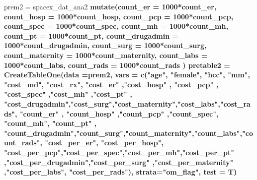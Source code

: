 \documentclass[]{article}
\newenvironment{Shaded}{\begin{snugshade}}{\end{snugshade}}
\newcommand{\KeywordTok}[1]{\textcolor[rgb]{0.13,0.29,0.53}{\textbf{#1}}}
\newcommand{\DataTypeTok}[1]{\textcolor[rgb]{0.13,0.29,0.53}{#1}}
\newcommand{\DecValTok}[1]{\textcolor[rgb]{0.00,0.00,0.81}{#1}}
\newcommand{\StringTok}[1]{\textcolor[rgb]{0.31,0.60,0.02}{#1}}
\newcommand{\OperatorTok}[1]{\textcolor[rgb]{0.81,0.36,0.00}{\textbf{#1}}}
\newcommand{\NormalTok}[1]{#1}
\begin{document}
\begin{Shaded}
\begin{Highlighting}[]
\NormalTok{prem2 =}\StringTok{ }\NormalTok{spacex_dat_ana2 }\OperatorTok{%>%}
\StringTok{  }\KeywordTok{mutate}\NormalTok{(}\DataTypeTok{count_er =} \DecValTok{1000}\OperatorTok{*}\NormalTok{count_er,}
         \DataTypeTok{count_hosp =} \DecValTok{1000}\OperatorTok{*}\NormalTok{count_hosp,}
         \DataTypeTok{count_pcp =} \DecValTok{1000}\OperatorTok{*}\NormalTok{count_pcp,}
         \DataTypeTok{count_spec =} \DecValTok{1000}\OperatorTok{*}\NormalTok{count_spec,}
         \DataTypeTok{count_mh =} \DecValTok{1000}\OperatorTok{*}\NormalTok{count_mh,}
         \DataTypeTok{count_pt =} \DecValTok{1000}\OperatorTok{*}\NormalTok{count_pt,}
         \DataTypeTok{count_drugadmin =} \DecValTok{1000}\OperatorTok{*}\NormalTok{count_drugadmin,}
         \DataTypeTok{count_surg =} \DecValTok{1000}\OperatorTok{*}\NormalTok{count_surg,}
         \DataTypeTok{count_maternity =} \DecValTok{1000}\OperatorTok{*}\NormalTok{count_maternity,}
         \DataTypeTok{count_labs =} \DecValTok{1000}\OperatorTok{*}\NormalTok{count_labs,}
         \DataTypeTok{count_rads =} \DecValTok{1000}\OperatorTok{*}\NormalTok{count_rads}
\NormalTok{  )}
\NormalTok{pretable2 =}\StringTok{ }\KeywordTok{CreateTableOne}\NormalTok{(}\DataTypeTok{data =}\NormalTok{prem2, }\DataTypeTok{vars =} \KeywordTok{c}\NormalTok{(}\StringTok{"age"}\NormalTok{, }\StringTok{"female"}\NormalTok{, }\StringTok{"hcc"}\NormalTok{, }\StringTok{"mm"}\NormalTok{, }\StringTok{"cost_md"}\NormalTok{, }\StringTok{"cost_rx"}\NormalTok{, }\StringTok{"cost_er"}\NormalTok{ ,}\StringTok{"cost_hosp"}\NormalTok{ , }\StringTok{"cost_pcp"}\NormalTok{  , }\StringTok{"cost_spec"}\NormalTok{  ,}\StringTok{"cost_mh"}\NormalTok{ ,}\StringTok{"cost_pt"}\NormalTok{ ,  }\StringTok{"cost_drugadmin"}\NormalTok{,}\StringTok{"cost_surg"}\NormalTok{,}\StringTok{"cost_maternity"}\NormalTok{,}\StringTok{"cost_labs"}\NormalTok{,}\StringTok{"cost_rads"}\NormalTok{, }\StringTok{"count_er"}\NormalTok{  , }\StringTok{"count_hosp"}\NormalTok{ ,}\StringTok{"count_pcp"}\NormalTok{ ,}\StringTok{"count_spec"}\NormalTok{, }\StringTok{"count_mh"}\NormalTok{,   }\StringTok{"count_pt"}\NormalTok{  , }\StringTok{"count_drugadmin"}\NormalTok{,}\StringTok{"count_surg"}\NormalTok{,}\StringTok{"count_maternity"}\NormalTok{,}\StringTok{"count_labs"}\NormalTok{,}\StringTok{"count_rads"}\NormalTok{, }\StringTok{"cost_per_er"}\NormalTok{, }\StringTok{"cost_per_hosp"}\NormalTok{, }\StringTok{"cost_per_pcp"}\NormalTok{,}\StringTok{"cost_per_spec"}\NormalTok{,}\StringTok{"cost_per_mh"}\NormalTok{,}\StringTok{"cost_per_pt"}\NormalTok{ ,}\StringTok{"cost_per_drugadmin"}\NormalTok{,}\StringTok{"cost_per_surg"}\NormalTok{   ,}\StringTok{"cost_per_maternity"}\NormalTok{ ,}\StringTok{"cost_per_labs"}\NormalTok{, }\StringTok{"cost_per_rads"}\NormalTok{), }\DataTypeTok{strata=}\StringTok{"om_flag"}\NormalTok{, }\DataTypeTok{test =}\NormalTok{ T)}
}
\end{Highlighting}
\end{Shaded}
\end{document}
